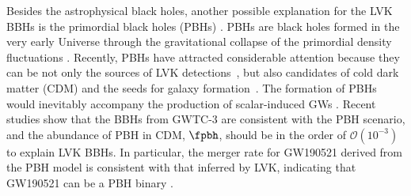 \documentclass[
reprint,           %
superscriptaddress,%
amsmath,           %
amssymb,           %
aps,               %
prd,               %
notitlepage,       %
longbibliography,  %
floatfix,          %
nofootinbib,
]{revtex4-1}
\begin{document}
Besides the astrophysical black holes, another possible explanation for the LVK BBHs is the primordial black holes (PBHs) \cite{Bird:2016dcv,Sasaki:2016jop,Chen:2018czv,Liu:2018ess,Chen:2021nxo}. 
PBHs are black holes formed in the very early Universe through the gravitational collapse of the primordial density fluctuations \cite{Hawking:1971ei,Carr:1974nx}. Recently, PBHs have attracted considerable attention \cite{Garcia-Bellido:2017mdw,Carr:2017jsz,Germani:2017bcs,Liu:2019rnx,Cai:2019elf,Cai:2019bmk,DeLuca:2020sae,Vaskonen:2020lbd,DeLuca:2020agl,Hutsi:2020sol,Sasaki:2018dmp,Carr:2020gox,Carr:2020xqk,Liu:2021jnw,Wang:2022nml,Franciolini:2022tfm} because they can be not only the sources of LVK detections~\cite{Bird:2016dcv,Sasaki:2016jop}, but also candidates of cold dark matter (CDM) \cite{Carr:2016drx} and the seeds for galaxy formation~\cite{Bean:2002kx,Kawasaki:2012kn}. The formation of PBHs would inevitably accompany the production of scalar-induced GWs \cite{Saito:2008jc,Cai:2018dig,Yuan:2019udt,Yuan:2019wwo,Yuan:2019fwv,Chen:2019xse,DeLuca:2019ufz,Bartolo:2018rku,Bartolo:2018evs}.
Recent studies \cite{Chen:2021nxo,Chen:2022fda} show that the BBHs from GWTC-3 are consistent with the PBH scenario, and the abundance of PBH in CDM, $\fpbh$, should be in the order of $\mathcal{O}(10^{-3})$ to explain LVK BBHs. In particular, the merger rate for GW190521 derived from the PBH model is consistent with that inferred by LVK, indicating that GW190521 can be a PBH binary \cite{DeLuca:2020sae,Chen:2021nxo}.
\end{document}
